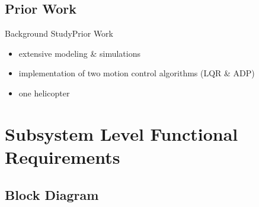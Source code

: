 \documentclass{beamer}
\begin{document}
\subsection{Prior Work}

\begin{frame}{Background Study}{Prior Work}
  \begin{itemize}
      \item extensive modeling \& simulations
      \item implementation of two motion control algorithms (LQR \& ADP)
      \item one helicopter
  \end{itemize}
\end{frame}



  


\section{Subsystem Level Functional Requirements}



\subsection{Block Diagram}
\end{document}
